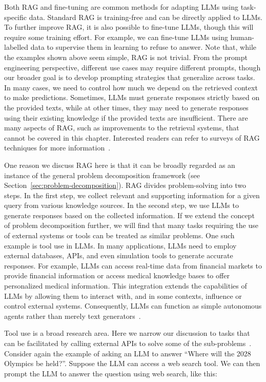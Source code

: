 Both RAG and fine-tuning are common methods for adapting LLMs using task-specific data. Standard RAG is training-free and can be directly applied to LLMs. To further improve RAG, it is also possible to fine-tune LLMs, though this will require some training effort. For example, we can fine-tune LLMs using human-labelled data to supervise them in learning to refuse to answer. Note that, while the examples shown above seem simple, RAG is not trivial. From the prompt engineering perspective, different use cases may require different prompts, though our broader goal is to develop prompting strategies that generalize across tasks. In many cases, we need to control how much we depend on the retrieved context to make predictions. Sometimes, LLMs must generate responses strictly based on the provided texts, while at other times, they may need to generate responses using their existing knowledge if the provided texts are insufficient. There are many aspects of RAG, such as improvements to the retrieval systems, that cannot be covered in this chapter. Interested readers can refer to surveys of RAG techniques for more information~\cite{li-etal:2022survey,gao-etal:2023retrieval}.

One reason we discuss RAG here is that it can be broadly regarded as an instance of the general problem decomposition framework (see Section~\ref{sec:problem-decomposition}). RAG divides problem-solving into two steps. In the first step, we collect relevant and supporting information for a given query from various knowledge sources. In the second step, we use LLMs to generate responses based on the collected information. If we extend the concept of problem decomposition further, we will find that many tasks requiring the use of external systems or tools can be treated as similar problems. One such example is tool use in LLMs. In many applications, LLMs need to employ external databases, APIs, and even simulation tools to generate accurate responses. For example, LLMs can access real-time data from financial markets to provide financial information or access medical knowledge bases to offer personalized medical information. This integration extends the capabilities of LLMs by allowing them to interact with, and in some contexts, influence or control external systems. Consequently, LLMs can function as simple autonomous agents rather than merely text generators~\cite{franklin-and-graesser:1996agent}.

Tool use is a broad research area. Here we narrow our discussion to tasks that can be facilitated by calling external APIs to solve some of the sub-problems~\cite{parisi-etal:2022talm,gao-etal:2023pal}. Consider again the example of asking an LLM to answer ``Where will the 2028 Olympics be held?''. Suppose the LLM can access a web search tool. We can then prompt the LLM to answer the question using web search, like this:

